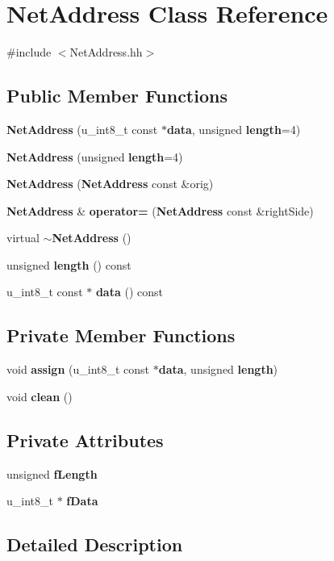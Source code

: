 \section{Net\+Address Class Reference}
\label{classNetAddress}


{\ttfamily \#include $<$Net\+Address.\+hh$>$}

\subsection*{Public Member Functions}
\begin{DoxyCompactItemize}
\item 
{\bf Net\+Address} (u\+\_\+int8\+\_\+t const $\ast${\bf data}, unsigned {\bf length}=4)
\item 
{\bf Net\+Address} (unsigned {\bf length}=4)
\item 
{\bf Net\+Address} ({\bf Net\+Address} const \&orig)
\item 
{\bf Net\+Address} \& {\bf operator=} ({\bf Net\+Address} const \&right\+Side)
\item 
virtual {\bf $\sim$\+Net\+Address} ()
\item 
unsigned {\bf length} () const 
\item 
u\+\_\+int8\+\_\+t const $\ast$ {\bf data} () const 
\end{DoxyCompactItemize}
\subsection*{Private Member Functions}
\begin{DoxyCompactItemize}
\item 
void {\bf assign} (u\+\_\+int8\+\_\+t const $\ast${\bf data}, unsigned {\bf length})
\item 
void {\bf clean} ()
\end{DoxyCompactItemize}
\subsection*{Private Attributes}
\begin{DoxyCompactItemize}
\item 
unsigned {\bf f\+Length}
\item 
u\+\_\+int8\+\_\+t $\ast$ {\bf f\+Data}
\end{DoxyCompactItemize}


\subsection{Detailed Description}


